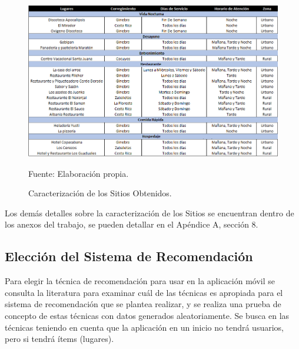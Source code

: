 \documentclass[12pt,letterpaper,openany]{book}
\begin{document}
\begin{figure}[H]
\begin{center}
\includegraphics[width=17cm]{./imagenes/caracterizacion}
\caption{Caracterización de los Sitios Obtenidos.}
\centering Fuente: Elaboración propia.
\end{center}
\end{figure}

Los demás detalles sobre la caracterización de los Sitios se encuentran dentro de los anexos del trabajo, se pueden detallar en el Apéndice A, sección 8.

\subsection{Elección del Sistema de Recomendación}
Para elegir la técnica de recomendación para usar en la aplicación móvil se consulta la literatura para examinar cuál de las técnicas es apropiada para el sistema de recomendación que se plantea realizar, y se realiza una prueba de concepto de estas técnicas con datos generados aleatoriamente.
\vspace{5mm}\newline
Se busca en las técnicas teniendo en cuenta que la aplicación en un inicio no tendrá usuarios, pero si tendrá ítems (lugares).
\end{document}
